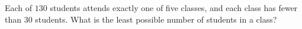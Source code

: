 Each of $130$ students attends exactly one of five classes, and each class has fewer than $30$ students. What is the least possible number of students in a class?
